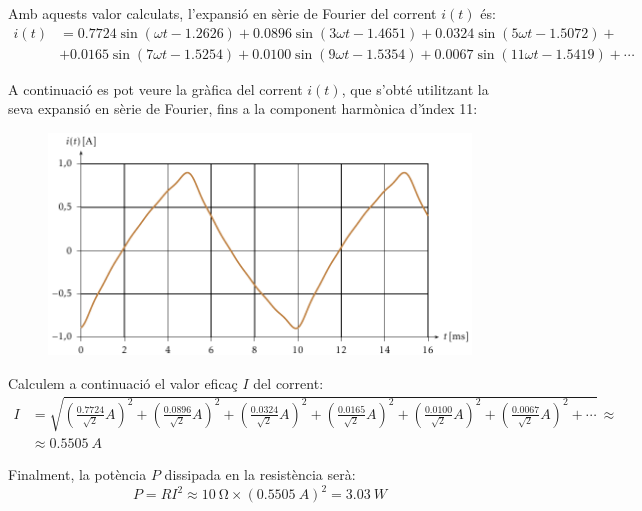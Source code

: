 \begin{exemple}
Amb aquests valor calculats, l'expansi\'{o} en s\`{e}rie de Fourier del
corrent $i(t)$ \'{e}s:
\[\begin{split}
     i(t) &=  \num{0,7724} \sin(\omega t - \num{1,2626}) +  \num{0,0896} \sin(3 \omega t -
     \num{1,4651}) + \num{0,0324} \sin(5 \omega t - \num{1,5072}) +{}\\
     &+ \num{0,0165} \sin(7 \omega t - \num{1,5254}) + \num{0,0100} \sin(9 \omega t - \num{1,5354})
     + \num{0,0067} \sin(11 \omega t - \num{1,5419}) +\cdots
\end{split}\]

A continuaci\'{o} es pot veure la gr\`{a}fica del corrent $i(t)$, que s'obt\'{e}
utilitzant la seva expansi\'{o} en s\`{e}rie de Fourier, fins a la component
harm\`{o}nica d'\'{\i}ndex 11:

\begin{figure}[h]
\centering
  \includegraphics{Imatges/Cap-Fourier-Exemple-Corrent.pdf}
\end{figure}

Calculem a continuaci\'{o} el valor efica\c{c} $I$ del corrent:
\[\begin{split}
    I &= \sqrt{\left(\tfrac{\num{0,7724}}{\sqrt{2}}\unit{A}\right)^2 +
        \left(\tfrac{\num{0,0896}}{\sqrt{2}}\unit{A}\right)^2 +
        \left(\tfrac{\num{0,0324}}{\sqrt{2}}\unit{A}\right)^2 +
        \left(\tfrac{\num{0,0165}}{\sqrt{2}}\unit{A}\right)^2 +
        \left(\tfrac{\num{0,0100}}{\sqrt{2}}\unit{A}\right)^2 +
        \left(\tfrac{\num{0,0067}}{\sqrt{2}}\unit{A}\right)^2 + \cdots}
        \,\approx \\[1ex]
        &\approx \SI{0,5505}{A}
\end{split}\]

Finalment, la pot\`{e}ncia $P$ dissipada en la resist\`{e}ncia ser\`{a}:
\[
    P = R I^2 \approx \SI{10}{\ohm} \times (\SI{0,5505}{A})^2 =
    \SI{3,03}{W}
\]


\end{exemple}
